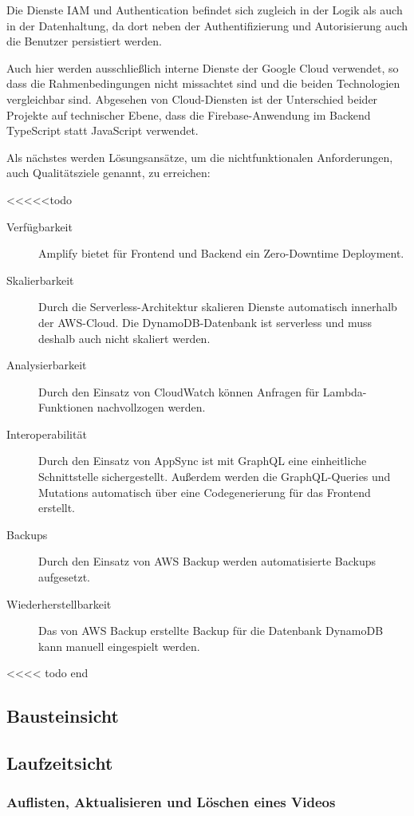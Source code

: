 Die Dienste IAM und Authentication befindet sich zugleich in der Logik als auch in der Datenhaltung, da dort neben der Authentifizierung und Autorisierung auch die Benutzer persistiert werden.

Auch hier werden ausschließlich interne Dienste der Google Cloud verwendet, so dass die Rahmenbedingungen nicht missachtet sind und die beiden Technologien vergleichbar sind. Abgesehen von Cloud-Diensten ist der Unterschied beider Projekte auf technischer Ebene, dass die Firebase-Anwendung im Backend TypeScript statt JavaScript verwendet.

Als nächstes werden Lösungsansätze, um die nichtfunktionalen Anforderungen, auch Qualitätsziele genannt, zu erreichen:

<<<<<todo
\begin{description}
   \item[Verfügbarkeit] Amplify bietet für Frontend und Backend ein Zero-Downtime Deployment.
   \item[Skalierbarkeit] Durch die Serverless-Architektur skalieren Dienste automatisch innerhalb der \ac{AWS}-Cloud. Die DynamoDB-Datenbank ist serverless und muss deshalb auch nicht skaliert werden.
   \item[Analysierbarkeit] Durch den Einsatz von CloudWatch können Anfragen für Lambda-Funktionen nachvollzogen werden.
   \item[Interoperabilität] Durch den Einsatz von AppSync ist mit GraphQL eine einheitliche Schnittstelle sichergestellt. Außerdem werden die GraphQL-Queries und Mutations automatisch über eine Codegenerierung für das Frontend erstellt.
   \item[Backups] Durch den Einsatz von AWS Backup werden automatisierte Backups aufgesetzt.
   \item[Wiederherstellbarkeit] Das von AWS Backup erstellte Backup für die Datenbank DynamoDB kann manuell eingespielt werden.
\end{description}
<<<< todo end

\subsection{Bausteinsicht}

\subsection{Laufzeitsicht}

\subsubsection{Auflisten, Aktualisieren und Löschen eines Videos}


